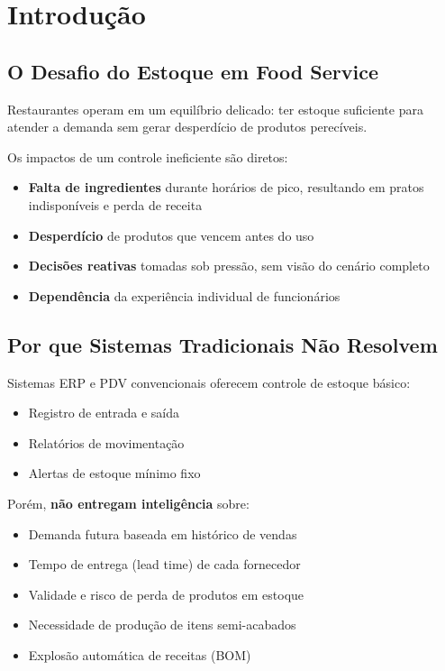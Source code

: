 
\section{Introdução}

\subsection{O Desafio do Estoque em Food Service}

Restaurantes operam em um equilíbrio delicado: ter estoque suficiente para
atender a demanda sem gerar desperdício de produtos perecíveis.

Os impactos de um controle ineficiente são diretos:

\begin{itemize}[leftmargin=2em]
  \item \textbf{Falta de ingredientes} durante horários de pico, resultando em
        pratos indisponíveis e perda de receita
  \item \textbf{Desperdício} de produtos que vencem antes do uso
  \item \textbf{Decisões reativas} tomadas sob pressão, sem visão do cenário
        completo
  \item \textbf{Dependência} da experiência individual de funcionários
\end{itemize}

\subsection{Por que Sistemas Tradicionais Não Resolvem}

Sistemas ERP e PDV convencionais oferecem controle de estoque básico:

\begin{itemize}[leftmargin=2em]
  \item Registro de entrada e saída
  \item Relatórios de movimentação
  \item Alertas de estoque mínimo fixo
\end{itemize}

Porém, \textbf{não entregam inteligência} sobre:

\begin{itemize}[leftmargin=2em]
  \item Demanda futura baseada em histórico de vendas
  \item Tempo de entrega (lead time) de cada fornecedor
  \item Validade e risco de perda de produtos em estoque
  \item Necessidade de produção de itens semi-acabados
  \item Explosão automática de receitas (BOM)
\end{itemize}

